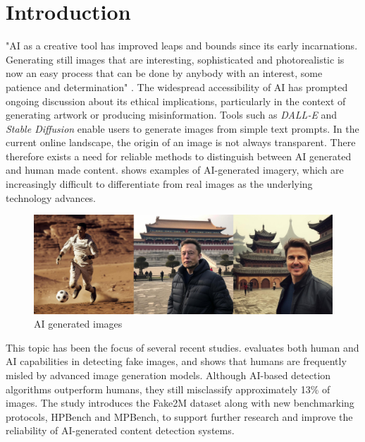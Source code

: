 \section{Introduction }

"AI as a creative tool has improved leaps and bounds since its early incarnations. Generating still images that are interesting, sophisticated and photorealistic is now an easy process that can be done by anybody with an interest, some patience and determination" \cite{scott2024ethics}. The widespread accessibility of AI has prompted ongoing discussion about its ethical implications, particularly in the context of generating artwork or producing misinformation. Tools such as \textit{DALL-E} and \textit{Stable Diffusion} enable users to generate images from simple text prompts. In the current online landscape, the origin of an image is not always transparent. There therefore exists a need for reliable methods to distinguish between AI generated and human made content.  shows examples of AI-generated imagery, which are increasingly difficult to differentiate from real images as the underlying technology advances.

\begin{figure}[h]
    \centering
    \includegraphics[width=0.8 \linewidth]{figures/ai_generated_images_from_seeing_is_not_believing.png} %
    \centering
    \caption{AI generated images \cite{lu2023seeingbelievingbenchmarkinghuman}} %
    \label{fig:ai_generated_images} %
\end{figure}

This topic has been the focus of several recent studies. \cite{lu2023seeingbelievingbenchmarkinghuman} evaluates both human and AI capabilities in detecting fake images, and shows that humans are frequently misled by advanced image generation models. Although AI-based detection algorithms outperform humans, they still misclassify approximately 13\% of images. The study introduces the Fake2M dataset along with new benchmarking protocols, HPBench and MPBench, to support further research and improve the reliability of AI-generated content detection systems.

